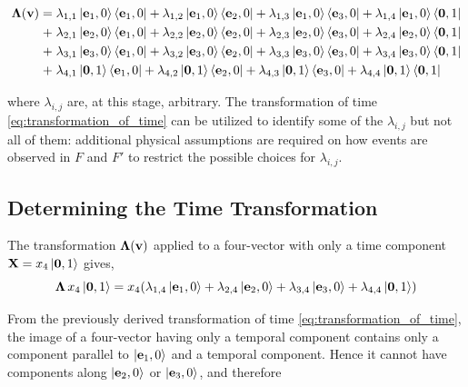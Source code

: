 \documentclass[12pt]{article}
\begin{document}
\begin{equation}
  \begin{aligned}
    \boldsymbol{\Lambda}(\vb{v}) =\;
      &\lambda_{1,1}\ket{\vb{e}_1,0}\bra{\vb{e}_1,0}
      + \lambda_{1,2}\ket{\vb{e}_1,0}\bra{\vb{e}_2,0}
      + \lambda_{1,3}\ket{\vb{e}_1,0}\bra{\vb{e}_3,0}
      + \lambda_{1,4}\ket{\vb{e}_1,0}\bra{\vb{0},1} \\
    +\;&\lambda_{2,1}\ket{\vb{e}_2,0}\bra{\vb{e}_1,0}
      + \lambda_{2,2}\ket{\vb{e}_2,0}\bra{\vb{e}_2,0}
      + \lambda_{2,3}\ket{\vb{e}_2,0}\bra{\vb{e}_3,0}
      + \lambda_{2,4}\ket{\vb{e}_2,0}\bra{\vb{0},1} \\
    +\;&\lambda_{3,1}\ket{\vb{e}_3,0}\bra{\vb{e}_1,0}
      + \lambda_{3,2}\ket{\vb{e}_3,0}\bra{\vb{e}_2,0}
      + \lambda_{3,3}\ket{\vb{e}_3,0}\bra{\vb{e}_3,0}
      + \lambda_{3,4}\ket{\vb{e}_3,0}\bra{\vb{0},1} \\
    +\;&\lambda_{4,1}\ket{\vb{0},1}\bra{\vb{e}_1,0}
      + \lambda_{4,2}\ket{\vb{0},1}\bra{\vb{e}_2,0}
      + \lambda_{4,3}\ket{\vb{0},1}\bra{\vb{e}_3,0}
      + \lambda_{4,4}\ket{\vb{0},1}\bra{\vb{0},1}
  \end{aligned}
  \label{eq:general_Lorentz}
\end{equation}

where $\lambda_{i,j}$ are, at this stage, arbitrary. The transformation of time
\eqref{eq:transformation_of_time} can be utilized to identify some of the $\lambda_{i,j}$ but
not all of them: additional physical assumptions are required on how events are observed in $F$ and $F'$ to
restrict the possible choices for $\lambda_{i,j}$.

\subsection{Determining the Time Transformation}

The transformation $\boldsymbol{\Lambda}(\vb{v})$ applied to a four-vector with only a time
component $\vb{X} = x_4\ket{\vb{0},1}$ gives,
\[
  \boldsymbol{\Lambda}\, x_4\ket{\vb{0},1}
  = x_4\!\left(
      \lambda_{1,4}\ket{\vb{e}_1,0}
    + \lambda_{2,4}\ket{\vb{e}_2,0}
    + \lambda_{3,4}\ket{\vb{e}_3,0}
    + \lambda_{4,4}\ket{\vb{0},1}
  \right)
\]

From the previously derived transformation of time
\eqref{eq:transformation_of_time}, the image of a four-vector having only
a temporal component contains only a component parallel to
$\ket{\vb{e}_1,0}$ and a temporal component. Hence it cannot have
components along $\ket{\vb{e}_2,0}$ or $\ket{\vb{e}_3,0}$, and therefore
\end{document}
